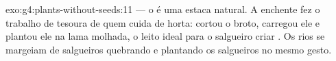 \begin{solution}{exo:g4:plants-without-seeds:11}
 --- o  é uma estaca natural. A enchente
fez o trabalho de tesoura de quem cuida de horta: cortou o broto,
carregou ele e plantou ele na lama molhada, o leito ideal para o
salgueiro criar . Os rios se margeiam de salgueiros quebrando e
plantando os salgueiros no mesmo gesto.
\end{solution}
